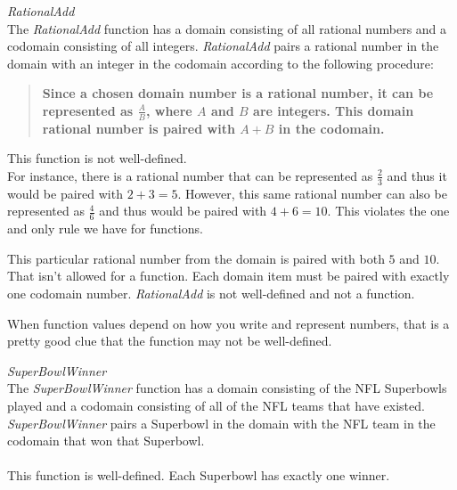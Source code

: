 \documentclass{ximera}
\begin{document}
\begin{example} \textit{RationalAdd} \\
The \textit{RationalAdd} function has a domain consisting of all rational numbers and a codomain consisting of all integers.  \textit{RationalAdd} pairs a rational number in the domain with an integer in the codomain according to the following procedure: \\ 
\begin{quote}
\textbf{\textcolor{blue!55!black}{Since a chosen domain number is a rational number, it can be represented as $\tfrac{A}{B}$, where $A$ and $B$ are integers. This domain rational number is paired with $A+B$ in the codomain.}} 
\end{quote}
 
This function is not well-defined.  \\

For instance, there is a rational number that can be represented as $\tfrac{2}{3}$ and thus it would be paired with $2 + 3 = 5$.  However, this same rational number can also be represented as $\tfrac{4}{6}$ and thus would be paired with $4 + 6 = 10$.  This violates the one and only rule we have for functions.  


This particular rational number from the domain is paired with both $5$ and $10$. That isn't allowed for a function. Each domain item must be paired with exactly one codomain number. \textit{RationalAdd} is not well-defined and not a function.

\begin{warning}
When function values depend on how you write and represent numbers, that is a pretty good clue that the function may not be well-defined.
\end{warning}
\end{example}



\begin{example} \textit{SuperBowlWinner}  \\
The \textit{SuperBowlWinner} function has a domain consisting of the NFL Superbowls played and a codomain consisting of all of the NFL teams that have existed.  \textit{SuperBowlWinner} pairs a Superbowl in the domain with the NFL team in the codomain that won that Superbowl.  \\ 
\\
This function is well-defined. Each Superbowl has exactly one winner.
\end{example}
\end{document}
